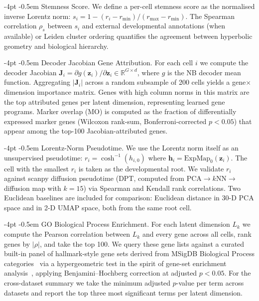 \documentclass[preprint,12pt]{elsarticle}
\makeatletter
\renewcommand\paragraph{\@startsection{paragraph}{4}{\z@}%
  {-4pt \@plus -1pt \@minus -1pt}%
  {-0.5em}%
  {\normalfont\normalsize\bfseries}}
\newcommand{\rea}{\mathbb{R}}
\newcommand{\bz}{\mathbf{z}}
\makeatother
\begin{document}
\paragraph{Stemness Score.}
We define a per-cell stemness score as the normalised inverse Lorentz
norm: $s_i = 1 - (r_i - r_\text{min}) / (r_\text{max} - r_\text{min})$.
The Spearman correlation $\rho_s$ between $s_i$ and external
developmental annotations (when available) or Leiden cluster ordering
quantifies the agreement between hyperbolic geometry and biological
hierarchy.

\paragraph{Decoder Jacobian Gene Attribution.}
For each cell $i$ we compute the decoder Jacobian
$\mathbf{J}_i = \partial g(\bz_i) / \partial \bz_i \in \rea^{G \times d}$,
where $g$ is the NB decoder mean function.
Aggregating $|\mathbf{J}_i|$ across a random subsample of 200 cells
yields a gene$\times$dimension importance matrix.
Genes with high column norms in this matrix are the top attributed
genes per latent dimension, representing learned gene programs.
Marker overlap (MO) is computed as the fraction of differentially
expressed marker genes (Wilcoxon rank-sum, Bonferroni-corrected
$p < 0.05$) that appear among the top-100 Jacobian-attributed genes.

\paragraph{Lorentz-Norm Pseudotime.}
We use the Lorentz norm itself as an unsupervised pseudotime:
$r_i = \cosh^{-1}(h_{i,0})$ where $\mathbf{h}_i = \text{ExpMap}_0(\bz_i)$.
The cell with the smallest $r_i$ is taken as the developmental root.
We validate $r_i$ against scanpy diffusion pseudotime (DPT,
computed from PCA$\to$$k$NN$\to$diffusion map with $k{=}15$) via
Spearman and Kendall rank correlations.
Two Euclidean baselines are included for comparison:
Euclidean distance in 30-D PCA space and in 2-D UMAP space, both
from the same root cell.

\paragraph{GO Biological Process Enrichment.}
For each latent dimension $L_k$ we compute the Pearson correlation
between $L_k$ and every gene across all cells, rank genes by
$|\rho|$, and take the top 100.
We query these gene lists against a curated built-in panel of
hallmark-style gene sets derived from MSigDB Biological Process
categories~\cite{ashburner2000go} via a hypergeometric test in the
spirit of gene-set enrichment
analysis~\cite{subramanian2005gsea}, applying
Benjamini--Hochberg correction at adjusted $p<0.05$.
For the cross-dataset summary we take the minimum adjusted $p$-value
per term across datasets and report the top three most significant
terms per latent dimension.
\end{document}
